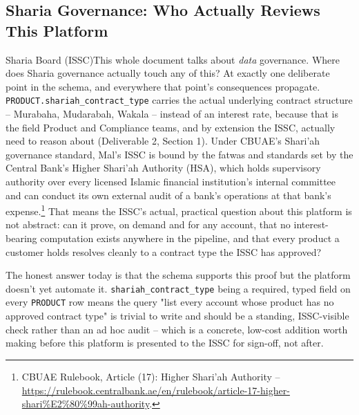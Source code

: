 \documentclass[11pt]{article}
\begin{document}
\subsection{Sharia Governance: Who Actually Reviews This Platform}
\begin{stakeholderq}{Sharia Board (ISSC)}{This whole document talks about \emph{data} governance. Where does Sharia governance actually touch any of this?}
At exactly one deliberate point in the schema, and everywhere that point's consequences propagate. \texttt{PRODUCT.shariah\_contract\_type} carries the actual underlying contract structure -- Murabaha, Mudarabah, Wakala -- instead of an interest rate, because that is the field Product and Compliance teams, and by extension the ISSC, actually need to reason about (Deliverable 2, Section 1). Under CBUAE's Shari'ah governance standard, Mal's ISSC is bound by the fatwas and standards set by the Central Bank's Higher Shari'ah Authority (HSA), which holds supervisory authority over every licensed Islamic financial institution's internal committee and can conduct its own external audit of a bank's operations at that bank's expense.\footnote{CBUAE Rulebook, Article (17): Higher Shari'ah Authority -- \url{https://rulebook.centralbank.ae/en/rulebook/article-17-higher-shari\%E2\%80\%99ah-authority}.} That means the ISSC's actual, practical question about this platform is not abstract: can it prove, on demand and for any account, that no interest-bearing computation exists anywhere in the pipeline, and that every product a customer holds resolves cleanly to a contract type the ISSC has approved?

The honest answer today is that the schema supports this proof but the platform doesn't yet automate it. \texttt{shariah\_contract\_type} being a required, typed field on every \texttt{PRODUCT} row means the query "list every account whose product has no approved contract type" is trivial to write and should be a standing, ISSC-visible check rather than an ad hoc audit -- which is a concrete, low-cost addition worth making before this platform is presented to the ISSC for sign-off, not after.
\end{stakeholderq}
\end{document}
